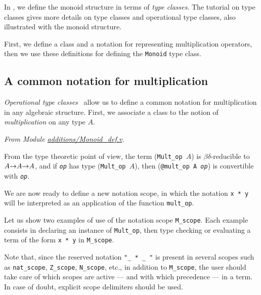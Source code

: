 In \coq{}, we define the monoid structure in terms of 
\emph{type classes}\cite{MS08,BS2011}. The tutorial on type classes \cite{PCMS} gives more details on type classes and
operational type classes, also illustrated with the monoid structure.


First, we define a class and a notation for representing multiplication operators, then we use
these definitions for defining the \texttt{Monoid} type class.

\subsection{A common notation for multiplication}
\label{op-classes}

\emph{Operational type classes}~\cite{BS2011}
allow us to define a common notation 
for multiplication in any algebraic structure. 
First, we associate a class to the notion of \emph{multiplication} 
on any type $A$.

\emph{From Module \href{../theories/html/additions.Monoid_def.html}{additions/Monoid\_def.v}.}


From the type theoretic point of view, the term (\texttt{Mult\_op $A$}) is 
$\beta\delta$-reducible to \texttt{$A\mbox{$\rightarrow$} A \mbox{$\rightarrow$} A$}, and
if \texttt{\it op} has type (\texttt{Mult\_op $A$}), then 
(\texttt{@mult\_op A {\it op}}) is convertible with \texttt{\it op}.


We are now ready to define a new notation scope, in which the notation
\texttt{x * y} will be interpreted as an application of the function
\texttt{mult\_op}.


 Let us show two examples of use of the
notation scope \texttt{M\_scope}. Each example consists in declaring an 
instance of \texttt{Mult\_op}, then type checking or evaluating
a term of the form \texttt{x * y} in \texttt{M\_scope}.

Note that, since the reserved notation \texttt{"\_ * \_ "} is 
present in several scopes such as  \texttt{nat\_scope}, \texttt{Z\_scope},
\texttt{N\_scope}, etc., in addition to  \texttt{M\_scope},  the user should
take care of which scopes are active --- and with  which precedence --- in a \gallina{} term.
In case of doubt, explicit scope delimiters should be used.
  




